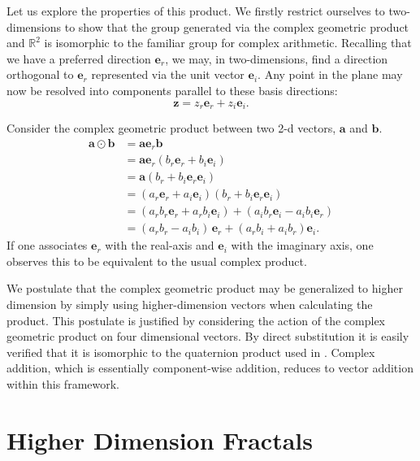 \documentclass{elsart}
\theoremstyle{definition}
\newcommand{\complexprod}{\odot}
\begin{document}
Let us explore the properties of this product. We firstly restrict ourselves to
two-dimensions to show that the group generated via the complex geometric
product and $\mathbb{R}^2$ is isomorphic to the familiar group for complex
arithmetic.  Recalling that we have a preferred direction ${\mathbf e}_r$, we
may, in two-dimensions, find a direction orthogonal to ${\mathbf e}_r$
represented via the unit vector ${\mathbf e}_i$.  Any point in the plane may
now be resolved into components parallel to these basis directions:
\begin{equation}
{\mathbf z} = z_r{\mathbf e}_r + z_i{\mathbf e}_i.
\end{equation}

Consider the complex geometric product between two 2-d vectors, ${\mathbf a}$ 
and ${\mathbf b}$.
\begin{align*}
{\mathbf a} \complexprod {\mathbf b} & = {\mathbf a}{\mathbf e}_r{\mathbf b} \\
&= {\mathbf a}{\mathbf e}_r(b_r{\mathbf e}_r + b_i{\mathbf e}_i) \\
&= {\mathbf a}(b_r + b_i{\mathbf e}_r{\mathbf e}_i) \\
&= (a_r{\mathbf e}_r + a_i{\mathbf e}_i)(b_r + b_i{\mathbf e}_r{\mathbf e}_i) \\
&= (a_r b_r{\mathbf e}_r  + a_r b_i{\mathbf e}_i) +
   (a_i b_r{\mathbf e}_i - a_i b_i{\mathbf e}_r)\\
&= (a_r b_r - a_i b_i)\,{\mathbf e}_r  + (a_rb_i + a_ib_r){\mathbf e}_i.
\end{align*}
If one associates ${\mathbf e}_r$ with the real-axis and ${\mathbf e}_i$ with
the imaginary axis, one observes this to be equivalent to the usual complex
product.

We postulate that the complex geometric product may be generalized to higher
dimension by simply using higher-dimension vectors when calculating the product.
This postulate is justified by considering the action of the complex geometric
product on four dimensional vectors. By direct substitution it is easily verified
that it is isomorphic to the quaternion product used in
\cite{FRAC:HypercomplexIterations}.
Complex addition, which is essentially component-wise addition, reduces to 
vector addition within this framework.

\section{Higher Dimension Fractals}
\end{document}
